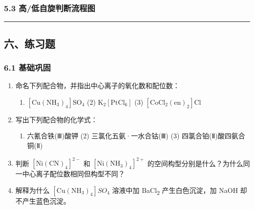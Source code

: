 \subsubsection{5.3 高/低自旋判断流程图}\label{ux9ad8ux4f4eux81eaux65cbux5224ux65adux6d41ux7a0bux56fe}

\begin{Shaded}
\begin{Highlighting}[]
\end{Highlighting}
\end{Shaded}

\begin{center}\rule{0.5\linewidth}{0.5pt}\end{center}

\subsection{六、练习题}\label{ux516dux7ec3ux4e60ux9898}

\subsubsection{6.1 基础巩固}\label{ux57faux7840ux5de9ux56fa}

\begin{enumerate}
\def\labelenumi{\arabic{enumi}.}
\item
  命名下列配合物，并指出中心离子的氧化数和配位数：

  \begin{enumerate}
  \def\labelenumii{(\arabic{enumii})}
  \tightlist
  \item
    \(\mathrm{[Cu(NH_3)_4]SO_4}\) (2) \(\mathrm{K_2[PtCl_6]}\) (3) \(\mathrm{[CoCl_2(en)_2]Cl}\)
  \end{enumerate}
\item
  写出下列配合物的化学式：

  \begin{enumerate}
  \def\labelenumii{(\arabic{enumii})}
  \tightlist
  \item
    六氰合铁(Ⅲ)酸钾 (2) 三氯化五氨·一水合钴(Ⅲ) (3) 四氯合铂(Ⅱ)酸四氨合铜(Ⅱ)
  \end{enumerate}
\item
  判断 \(\mathrm{[Ni(CN)_4]^{2-}}\) 和 \(\mathrm{[Ni(NH_3)_4]^{2+}}\) 的空间构型分别是什么？为什么同一中心离子配位数相同但构型不同？
\item
  解释为什么 \([\mathrm{Cu(NH_3)_4}]SO_4\) 溶液中加 BaCl\textsubscript{2} 产生白色沉淀，加 NaOH 却不产生蓝色沉淀。
\end{enumerate}

